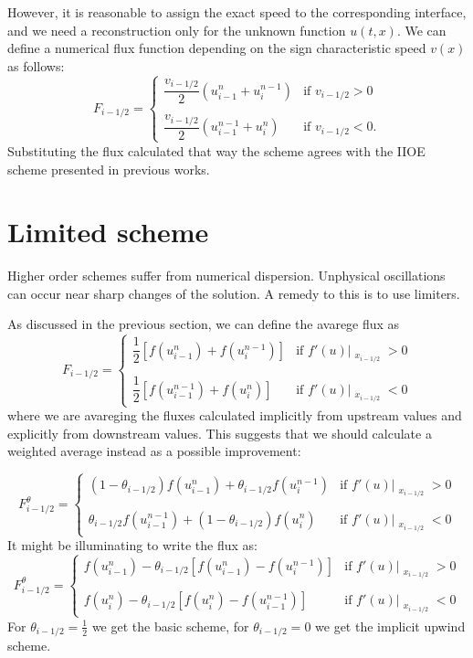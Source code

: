 \documentclass{article}
\begin{document}
However, it is reasonable to assign the exact speed to the corresponding interface, and we need a reconstruction only for the unknown function $ u(t,x) $. We can define a numerical flux function depending on the sign characteristic speed $ v(x) $ as follows:
\[
F_{i - 1/2} = 
\begin{cases}
	\dfrac{v_{i-1/2}}{2}(u^n_{i-1} + u^{n-1}_{i}) &  \text{if } v_{i-1/2} > 0\\
	\\
	\dfrac{v_{i-1/2}}{2}(u^{n-1}_{i-1} + u^{n}_{i}) &  \text{if } v_{i-1/2} < 0.
\end{cases}
\]
Substituting the flux calculated that way the scheme agrees with the IIOE scheme presented in previous works.

\section{Limited scheme}
Higher order schemes suffer from numerical dispersion. Unphysical oscillations can occur near sharp changes of the solution. A remedy to this is to use limiters.

As discussed in the previous section, we can define the avarege flux as
\[
F_{i - 1/2} = 
\begin{cases}
	\dfrac{1}{2}\left[f(u^n_{i-1}) + f(u^{n-1}_{i})\right] &  \text{if } f'(u)\big|_{\substack{x_{i-1/2}}} > 0\\
	\\
	\dfrac{1}{2}\left[f(u^{n-1}_{i-1}) + f(u^{n}_{i})\right] &  \text{if } f'(u)\big|_{\substack{x_{i-1/2}}} < 0
\end{cases}
\]
where we are avareging the fluxes calculated implicitly from upstream values and explicitly from downstream values. This suggests that we should calculate a weighted average instead as a possible improvement:

\[
F_{i - 1/2}^{\theta} = 
\begin{cases}
	(1-\theta_{i-1/2})f(u^n_{i-1}) + \theta_{i-1/2} f(u^{n-1}_{i}) &  \text{if } f'(u)\big|_{\substack{x_{i-1/2}}} > 0\\
	\\
	\theta_{i-1/2} f(u^{n-1}_{i-1}) + (1-\theta_{i-1/2}) f(u^{n}_{i}) &  \text{if } f'(u)\big|_{\substack{x_{i-1/2}}} < 0
\end{cases}
\]
It might be illuminating to write the flux as:
\[
F_{i - 1/2}^{\theta} = 
\begin{cases}
	f(u^n_{i-1}) - \theta_{i-1/2} \left[f(u^n_{i-1}) - f(u^{n-1}_{i})\right] &  \text{if } f'(u)\big|_{\substack{x_{i-1/2}}} > 0\\
	\\
	f(u^{n}_{i}) - \theta_{i-1/2} \left[f(u^{n}_{i}) - f(u^{n-1}_{i-1})\right] &  \text{if } f'(u)\big|_{\substack{x_{i-1/2}}} < 0
\end{cases}
\]
For $ \theta_{i-1/2} = \frac{1}{2} $ we get the basic scheme, for $ \theta_{i-1/2} = 0 $ we get the implicit upwind scheme.
\end{document}
